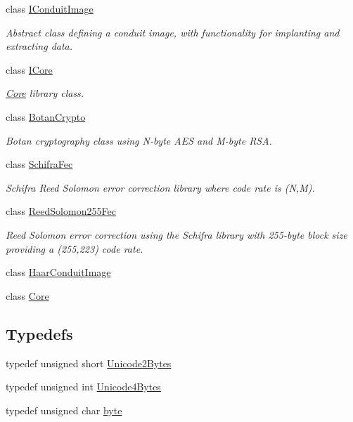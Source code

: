 \begin{DoxyCompactItemize}
class \hyperlink{classefb_1_1IConduitImage}{IConduitImage}
\begin{DoxyCompactList}\small\item\em Abstract class defining a conduit image, with functionality for implanting and extracting data. \item\end{DoxyCompactList}\item 
class \hyperlink{classefb_1_1ICore}{ICore}
\begin{DoxyCompactList}\small\item\em \hyperlink{classefb_1_1Core}{Core} library class. \item\end{DoxyCompactList}\item 
class \hyperlink{classefb_1_1BotanCrypto}{BotanCrypto}
\begin{DoxyCompactList}\small\item\em Botan cryptography class using N-\/byte AES and M-\/byte RSA. \item\end{DoxyCompactList}\item 
class \hyperlink{classefb_1_1SchifraFec}{SchifraFec}
\begin{DoxyCompactList}\small\item\em Schifra Reed Solomon error correction library where code rate is (N,M). \item\end{DoxyCompactList}\item 
class \hyperlink{classefb_1_1ReedSolomon255Fec}{ReedSolomon255Fec}
\begin{DoxyCompactList}\small\item\em Reed Solomon error correction using the Schifra library with 255-\/byte block size providing a (255,223) code rate. \item\end{DoxyCompactList}\item 
class \hyperlink{classefb_1_1HaarConduitImage}{HaarConduitImage}
\item 
class \hyperlink{classefb_1_1Core}{Core}
\end{DoxyCompactItemize}
\subsection*{Typedefs}
\begin{DoxyCompactItemize}
\item 
typedef unsigned short \hyperlink{namespaceefb_acce95f2192212162af47fde5af397bea}{Unicode2Bytes}
\item 
typedef unsigned int \hyperlink{namespaceefb_aa0d3cfad43f6f1a2056b87427ada3b74}{Unicode4Bytes}
\item 
typedef unsigned char \hyperlink{namespaceefb_a0c8186d9b9b7880309c27230bbb5e69d}{byte}
\end{DoxyCompactItemize}


